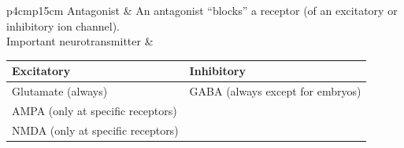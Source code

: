 \begin{longtable}{p{4cm}p{15cm}}
Antagonist		& An antagonist ``blocks'' a receptor (of an excitatory or inhibitory ion channel).\\
Important neurotransmitter	& \begin{tabular}[t]{ll}
				    Excitatory			& Inhibitory\\\hline
				    Glutamate (always)		& GABA (always except for embryos)\\
				    AMPA (only at specific receptors)\\
				    NMDA (only at specific receptors)\\
				  \end{tabular}\\
\end{longtable}